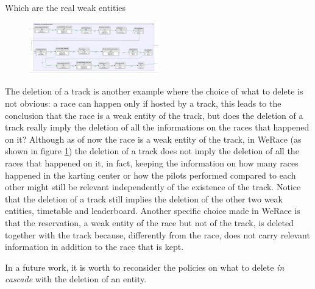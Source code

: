 \documentclass{beamer}
\newcommand{\kc}{WeRace}
\begin{document}
\begin{frame}{Which are the real weak entities}
    \scriptsize
    \begin{figure}
        \centering
        \includegraphics[width=0.5\textwidth]{drawio/del-track.png}
        \label{fig:delete-track}
    \end{figure}
    The deletion of a track is another example where the choice of what to delete is not obvious:
    a race can happen only if hosted by a track, this leads to the conclusion that the race is a weak entity 
    of the track, but does the deletion of a track really imply the deletion of all the informations on the races 
    that happened on it? Although as of now the race is a weak entity of the track, in \kc{} (as shown
    in figure \ref{fig:delete-track}) the deletion of a track does 
    not imply the deletion of all the races that happened on it, in fact, 
    keeping the information on how many races happened 
    in the karting center or how the pilots performed compared to each other
    might still be relevant independently of the existence of the track.
    Notice that the deletion of a track still implies the deletion of the other two weak entities, timetable and leaderboard.
    Another specific choice made in \kc{} is that the reservation, a weak entity of the race but not of the track, is deleted together 
    with the track because, differently from the race, does not carry relevant information in addition to the race that is kept.
    
    In a future work, it is worth to reconsider the policies on what to delete \textit{in cascade} with the deletion of an entity.
\end{frame}
\end{document}

